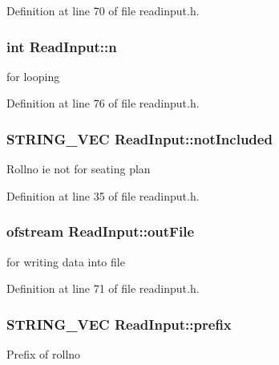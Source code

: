 Definition at line 70 of file readinput.\-h.

\hypertarget{classReadInput_a00428413f6f29154a5d1170c768bbe35}{
\subsubsection[{n}]{\setlength{\rightskip}{0pt plus 5cm}int Read\-Input\-::n\hspace{0.3cm}{\ttfamily [protected]}}}\label{classReadInput_a00428413f6f29154a5d1170c768bbe35}
for looping 

Definition at line 76 of file readinput.\-h.

\hypertarget{classReadInput_a4b4854ad4dd83b96d6c38d1f0b8d5417}{
\subsubsection[{not\-Included}]{\setlength{\rightskip}{0pt plus 5cm}S\-T\-R\-I\-N\-G\-\_\-\-V\-E\-C Read\-Input\-::not\-Included\hspace{0.3cm}{\ttfamily [protected]}}}\label{classReadInput_a4b4854ad4dd83b96d6c38d1f0b8d5417}
Rollno ie not for seating plan 

Definition at line 35 of file readinput.\-h.

\hypertarget{classReadInput_af50237ba8a8e8e4a9e4ccc7926215937}{
\subsubsection[{out\-File}]{\setlength{\rightskip}{0pt plus 5cm}ofstream Read\-Input\-::out\-File\hspace{0.3cm}{\ttfamily [protected]}}}\label{classReadInput_af50237ba8a8e8e4a9e4ccc7926215937}
for writing data into file 

Definition at line 71 of file readinput.\-h.

\hypertarget{classReadInput_a6a96c934f8c9a2a2056dc50505017e52}{
\subsubsection[{prefix}]{\setlength{\rightskip}{0pt plus 5cm}S\-T\-R\-I\-N\-G\-\_\-\-V\-E\-C Read\-Input\-::prefix\hspace{0.3cm}{\ttfamily [protected]}}}\label{classReadInput_a6a96c934f8c9a2a2056dc50505017e52}
Prefix of rollno 

